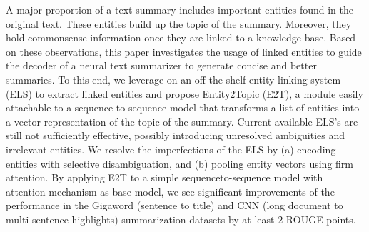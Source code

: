 A major proportion of a text summary includes important entities found in the original text. These entities build up the topic of the summary. Moreover, they hold commonsense information once they are linked to a knowledge base. Based on these observations, this paper investigates the usage of linked entities to guide the decoder of a neural text summarizer to generate concise and better summaries. To this end, we leverage on an off-the-shelf entity linking system (ELS) to extract linked entities and propose Entity2Topic (E2T), a module easily attachable to a sequence-to-sequence model that transforms a list of entities into a vector representation of the topic of the summary. Current available ELS's are still not sufficiently effective, possibly introducing unresolved ambiguities and irrelevant entities. We resolve the imperfections of the ELS by (a) encoding entities with selective disambiguation, and (b) pooling entity vectors using firm attention. By applying E2T to a simple sequenceto-sequence model with attention mechanism as base model, we see significant improvements of the performance in the Gigaword (sentence to title) and CNN (long document to multi-sentence highlights) summarization datasets by at least 2 ROUGE points.
